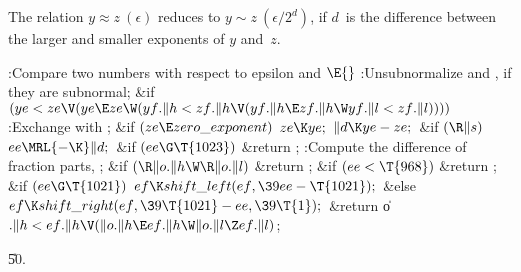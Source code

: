 The relation $y\approx z\ (\epsilon)$ reduces to
$y\sim z\ (\epsilon/2^d)$, if $d$~is the difference between the
larger and smaller exponents of $y$ and~$z$.

\Y\B\4:Compare two numbers with respect to epsilon and \X${}%
\E{}$\6
:Unsubnormalize  and , if they are subnormal\X;\6
\&{if} ${}(\\{ye}<\\{ze}\V(\\{ye}\E\\{ze}\W(\\{yf}.\|h<\\{zf}.\|h\V(\\{yf}.\|h%
\E\\{zf}.\|h\W\\{yf}.\|l<\\{zf}.\|l)))){}$\1\5
:Exchange  with \X;\2\6
\&{if} ${}(\\{ze}\E\\{zero\_exponent}){}$\1\5
${}\\{ze}\K\\{ye};{}$\2\6
${}\|d\K\\{ye}-\\{ze};{}$\6
\&{if} ${}(\R\|s){}$\1\5
${}\\{ee}\MRL{-{\K}}\|d;{}$\2\6
\&{if} ${}(\\{ee}\G\T{1023}){}$\1\5
\&{return} ;\2\6
:Compute the difference of fraction parts, \X;\6
\&{if} ${}(\R\|o.\|h\W\R\|o.\|l){}$\1\5
\&{return} ;\2\6
\&{if} ${}(\\{ee}<\T{968}){}$\1\5
\&{return} ;\2\6
\&{if} ${}(\\{ee}\G\T{1021}){}$\1\5
${}\\{ef}\K\\{shift\_left}(\\{ef},\39\\{ee}-\T{1021});{}$\2\6
\&{else}\1\5
${}\\{ef}\K\\{shift\_right}(\\{ef},\39\T{1021}-\\{ee},\39\T{1});{}$\2\6
\&{return} \|o${}.\|h<\\{ef}.\|h\V(\|o.\|h\E\\{ef}.\|h\W\|o.\|l\Z\\{ef}.%
\|l){}$;\par
\U50.\fi


